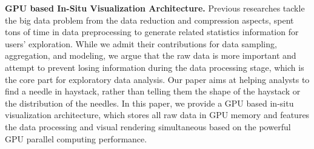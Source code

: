 \documentclass[journal]{vgtc}                %
\begin{document}
\textbf{GPU based In-Situ Visualization Architecture.} Previous researches tackle the big data problem from the data reduction and compression aspects, spent tons of time in data preprocessing to generate related statistics information for users' exploration. While we admit their contributions for data sampling, aggregation, and modeling, we argue that the raw data is more important and attempt to prevent losing information during the data processing stage, which is the core part for exploratory data analysis. Our paper aims at helping analysts to find a needle in haystack, rather than telling them the shape of the haystack or the distribution of the needles. In this paper, we provide a GPU based in-situ visualization architecture, which stores all raw data in GPU memory and  features the data processing and visual rendering simultaneous based on the powerful GPU parallel computing performance. 
\end{document}
